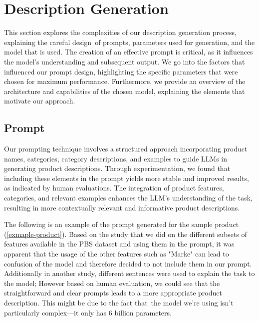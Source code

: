 \section{Description Generation}

This section explores the complexities of our description generation process, explaining the careful design of prompts, parameters used for generation, and the model that is used. The creation of an effective prompt is critical, as it influences the model's understanding and subsequent output. We go into the factors that influenced our prompt design, highlighting the specific parameters that were chosen for maximum performance. Furthermore, we provide an overview of the architecture and capabilities of the chosen model, explaining the elements that motivate our approach.

\subsection{Prompt}


Our prompting technique involves a structured approach incorporating product names, categories, category descriptions, and examples to guide LLMs in generating product descriptions. Through experimentation, we found that including these elements in the prompt yields more stable and improved results, as indicated by human evaluations. The integration of product features, categories, and relevant examples enhances the LLM's understanding of the task, resulting in more contextually relevant and informative product descriptions.

The following is an example of the prompt generated for the sample product (\autoref{exmaple-product}). Based on the study that we did on the different subsets of features available in the PBS dataset and using them in the prompt, it was apparent that the usage of the other features such as "Marke" can lead to confusion of the model and therefore decided to not include them in our prompt. Additionally in another study, different sentences were used to explain the task to the model; However based on human evaluation, we could see that the straightforward and clear prompts leads to a more appropriate product description. This might be due to the fact that the model we're using isn't particularly complex—it only has 6 billion parameters. 

